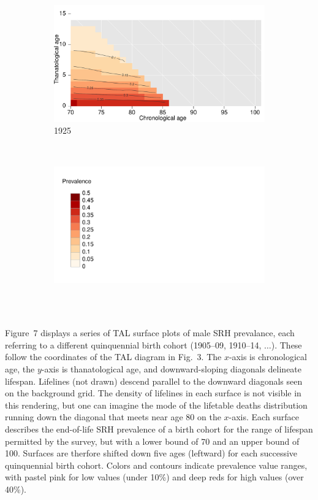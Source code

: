 \documentclass{bmcart}
\theoremstyle{definition}
\begin{document}
\begin{figure}[h!]
\begin{subfigure}{.46\textwidth}
\centering
\caption{1925}
\label{fig:srh1925}
\includegraphics[scale=0.25]{Fig7e.pdf}
\end{subfigure}
~
\begin{subfigure}{.46\textwidth}
\centering
\caption*{~}
\label{fig:srhlegend}
\includegraphics[scale=0.25]{Fig7Legend.pdf}
\end{subfigure}
\end{figure} 

Figure~7 displays a series of TAL surface plots of male SRH
prevalance, each referring to a different quinquennial birth cohort (1905--09, 1910--14, $\dots$). These follow the coordinates of the TAL diagram in Fig.~3.
The $x$-axis is chronological age, the $y$-axis is thanatological age, and
downward-sloping diagonals delineate lifespan. Lifelines (not drawn) descend
parallel to the downward diagonals seen on the background grid. The density of
lifelines in each surface is not visible in this rendering, but one can imagine
the mode of the lifetable deaths distribution running down the diagonal that
meets near age 80 on the $x$-axis. Each surface describes the end-of-life SRH
prevalence of a birth cohort for the range of lifespan permitted by the survey,
but with a lower bound of 70 and an upper bound of 100. Surfaces are therfore
shifted down five ages (leftward) for each successive quinquennial birth cohort.
Colors and contours indicate prevalence value ranges, with pastel pink for low
values (under 10\%) and deep reds for high values (over 40\%).
\end{document}
